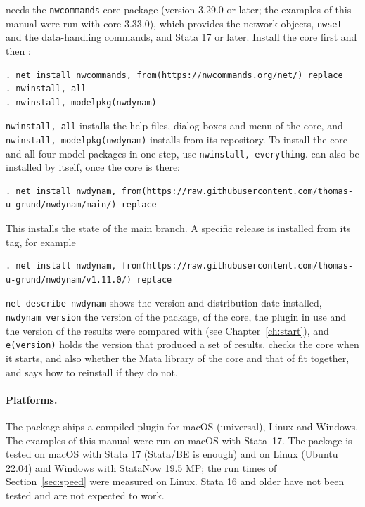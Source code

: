 \nwdynam{} needs the \texttt{nwcommands} core package (version 3.29.0 or later; the examples of this manual were run with core 3.33.0), which provides the network objects, \texttt{nwset} and the data-handling commands, and Stata 17 or later. Install the core first and then \nwdynam{}:
\begin{lstlisting}
. net install nwcommands, from(https://nwcommands.org/net/) replace
. nwinstall, all
. nwinstall, modelpkg(nwdynam)
\end{lstlisting}
\texttt{nwinstall, all} installs the help files, dialog boxes and menu of the core, and \texttt{nwinstall, modelpkg(nwdynam)} installs \nwdynam{} from its repository. To install the core and all four model packages in one step, use \texttt{nwinstall, everything}. \nwdynam{} can also be installed by itself, once the core is there:
\begin{lstlisting}
. net install nwdynam, from(https://raw.githubusercontent.com/thomas-u-grund/nwdynam/main/) replace
\end{lstlisting}
This installs the state of the main branch. A specific release is installed from its tag, for example
\begin{lstlisting}
. net install nwdynam, from(https://raw.githubusercontent.com/thomas-u-grund/nwdynam/v1.11.0/) replace
\end{lstlisting}
\texttt{net describe nwdynam} shows the version and distribution date installed, \texttt{nwdynam version} the version of the package, of the core, the plugin in use and the version of \goldfish{} the results were compared with (see Chapter~\ref{ch:start}), and \texttt{e(version)} holds the version that produced a set of results. \nwdynam{} checks the core when it starts, and also whether the Mata library of the core and that of \nwdynam{} fit together, and says how to reinstall if they do not.

\paragraph{Platforms.} The package ships a compiled plugin for macOS (universal), Linux and Windows. The examples of this manual were run on macOS with Stata~17. The package is tested on macOS with Stata 17 (Stata/BE is enough) and on Linux (Ubuntu 22.04) and Windows with StataNow 19.5 MP; the run times of Section~\ref{sec:speed} were measured on Linux.
Stata 16 and older have not been tested and are not expected to work.

